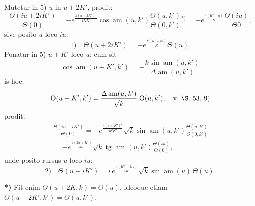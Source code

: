\documentclass{article}
\begin{document}
Mutetur in 5) $u$ in $u+2K'$, prodit:
\[
\frac{\Theta(iu+2iK')}{\Theta(0)}=-e^{\frac{\pi(u+2K')^{2}}{4KK'}}\cos\operatorname{am}(u,k')\frac{\Theta(u,k')}{\Theta(0,k')}{}^{*)}=-e^{\frac{\pi(K'+u)}{K}}\frac{\Theta(iu)}{\Theta 0},
\]
sive posito $u$ loco $iu$:
\[
\text{1)}\quad \Theta(u+2iK')=-e^{\frac{\pi(K'-iu)}{K}}\Theta(u).
\]
Ponatur in 5) $u+K'$ loco $u$: cum sit
\[
\cos\operatorname{am}(u+K',k')=-\frac{k\sin\operatorname{am}(u,k')}{\Delta\operatorname{am}(u,k')}
\]
is hoc:
\[
\Theta(u+K',k')=\frac{\Delta\operatorname{am}(u,k')}{\sqrt{k}}.\Theta(u,k'),\quad\text{v.\ }\S\text{.\ 53.\ 9)}
\]
prodit:
\[
\begin{gathered}
\frac{\Theta(iu+iK')}{\Theta(0)}=-e^{\frac{\pi(u+K')^{2}}{4KK'}}\sqrt{k}\sin\operatorname{am}(u,k')\frac{\Theta(u,k')}{\Theta(0,k')}\\[1.5ex]
=-e^{\frac{\pi(2u+K')}{4K}}\sqrt{k}\operatorname{tg}\operatorname{am}(u,k')\frac{\Theta(iu)}{\Theta(0)},
\end{gathered}
\]
unde posito rursus $u$ loco $iu$:
\[
\text{2)}\quad \Theta(u+iK')=i\,e^{\frac{\pi(K'-2iu)}{4K}}\sqrt{k}\sin\operatorname{am}(u)\,\Theta(u).
\]

\textbf{*)} Fit enim $\Theta(u+2K,k)=\Theta(u)$, ideoque etiam $\Theta(u+2K',k')=\Theta(u,k')$.
\end{document}
